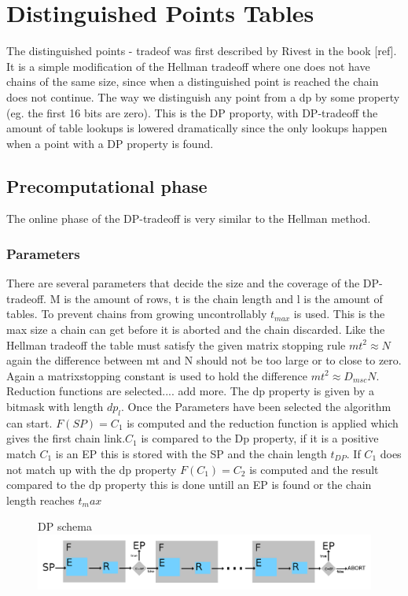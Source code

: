 \section{Distinguished Points Tables}
\label{sec:dptheory}
The distinguished points - tradeof was first described by Rivest in
the book [ref]. It is a simple modification of the Hellman tradeoff
where one does not have chains of the same size, since when a
distinguished point is reached the chain does not continue. The way we distinguish any point from a dp by some property (eg. the first 16 bits are zero). This is the DP proporty, with DP-tradeoff the amount of table lookups is lowered dramatically since the only lookups happen when a point with a DP property is found.
\subsection{Precomputational phase}
The online phase of the DP-tradeoff is very similar to the Hellman method.
\subsubsection{Parameters}
There are several parameters that decide the size and the coverage of
the DP-tradeoff. M is the amount of rows, t is the chain length  and l is the amount of tables.
To prevent chains from growing uncontrollably $t_{max}$ is used. This is the max size a chain can get before it is aborted and the chain discarded.
Like the Hellman tradeoff the table must satisfy the
given matrix stopping rule $mt^2\approx N$ again the difference between
mt and N should not be too large or to close to zero. Again a
matrixstopping constant is used to hold the difference $mt^2\approx
D_{msc}N$. Reduction functions are selected.... add more. The dp property is given by a bitmask with length $dp_l$.
Once the Parameters have been selected the algorithm can start. $F(SP)=C_1$ is computed and the reduction function is applied which gives the first chain link.$C_1$ is compared to the Dp property, if it is a positive match $C_1$ is an EP this is stored with the SP and the chain length $t_{DP}$. If $C_1$ does not match up with the dp property $F(C_1)=C_2$ is computed and the result compared to the dp property this is done untill an EP is found or the chain length reaches $t_max$


\begin{figure}[th]
  DP schema
  \includegraphics[width=\textwidth]{figures/DPSchema.png}
  \centering
\end{figure}

